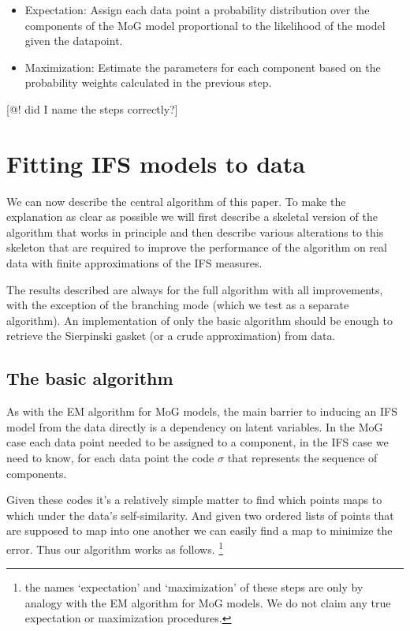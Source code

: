 \documentclass[10pt]{article}
\theoremstyle{definition}
\begin{document}
\begin{itemize}
  \item Expectation: Assign each data point a probability distribution over the components of the MoG model proportional to the likelihood of the model given the datapoint.
  \item Maximization: Estimate the parameters for each component based on the probability weights calculated in the previous step.  
\end{itemize} 

[@! did I name the steps correctly?] 

\section{Fitting IFS models to data}

We can now describe the central algorithm of this paper. To make the explanation as clear as possible we will first describe a skeletal version of the algorithm that works in principle and then describe various alterations to this skeleton that are required to improve the performance of the algorithm on real data with finite approximations of the IFS measures. 

The results described are always for the full algorithm with all improvements, with the exception of the branching mode (which we test as a separate algorithm). An implementation of only the basic algorithm should be enough to retrieve the Sierpinski gasket (or a crude approximation) from data.

\subsection{The basic algorithm}

As with the EM algorithm for MoG models, the main barrier to inducing an IFS model from the data directly is a dependency on latent variables. In the MoG case each data point needed to be assigned to a component, in the IFS case we need to know, for each data point the code $\sigma$ that represents the sequence of components. 

Given these codes it's a relatively simple matter to find which points maps to which under the data's self-similarity. And given two ordered lists of points that are supposed to map into one another we can easily find a map to minimize the error. Thus our algorithm works as follows. 
\footnote{the names `expectation' and `maximization' of these steps are only by analogy with the EM algorithm for MoG models. We do not claim any true expectation or maximization procedures.}
\end{document}
